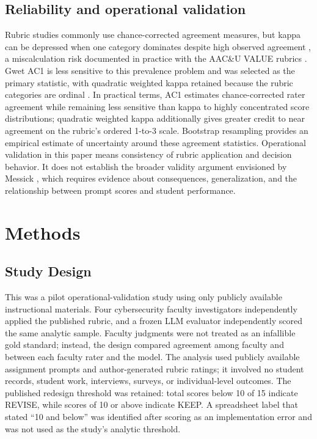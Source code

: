 \documentclass[sigconf]{acmart}
\begin{document}
\subsection{Reliability and operational validation}
Rubric studies commonly use chance-corrected agreement measures, but kappa can be depressed when one category dominates despite high observed agreement \cite{feinstein1990high}, a miscalculation risk documented in practice with the AAC\&U VALUE rubrics \cite{szafran2017miscalculation}. Gwet AC1 is less sensitive to this prevalence problem and was selected as the primary statistic, with quadratic weighted kappa retained because the rubric categories are ordinal \cite{cohen1968weighted,gwet2008computing}. In practical terms, AC1 estimates chance-corrected rater agreement while remaining less sensitive than kappa to highly concentrated score distributions; quadratic weighted kappa additionally gives greater credit to near agreement on the rubric's ordered 1-to-3 scale. Bootstrap resampling provides an empirical estimate of uncertainty around these agreement statistics. Operational validation in this paper means consistency of rubric application and decision behavior. It does not establish the broader validity argument envisioned by Messick \cite{messick1995validity}, which requires evidence about consequences, generalization, and the relationship between prompt scores and student performance.

\section{Methods}
\subsection{Study Design}
This was a pilot operational-validation study using only publicly available instructional materials. Four cybersecurity faculty investigators independently applied the published rubric, and a frozen LLM evaluator independently scored the same analytic sample. Faculty judgments were not treated as an infallible gold standard; instead, the design compared agreement among faculty and between each faculty rater and the model. The analysis used publicly available assignment prompts and author-generated rubric ratings; it involved no student records, student work, interviews, surveys, or individual-level outcomes. The published redesign threshold was retained: total scores below 10 of 15 indicate REVISE, while scores of 10 or above indicate KEEP. A spreadsheet label that stated ``10 and below'' was identified after scoring as an implementation error and was not used as the study's analytic threshold.
\end{document}
